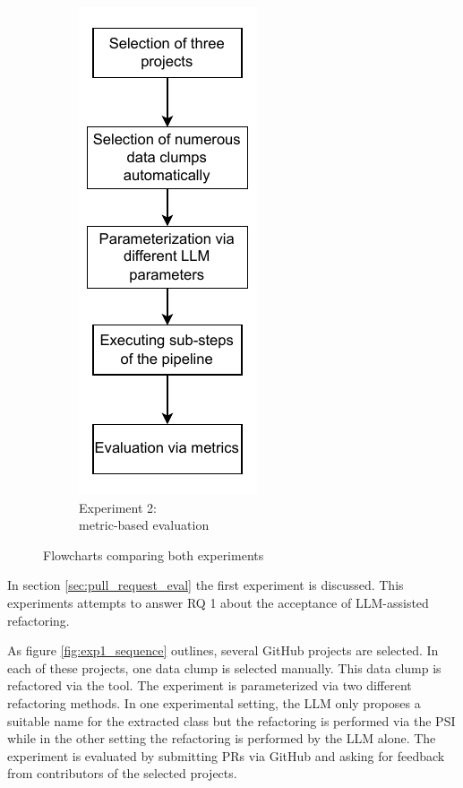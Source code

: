 \begin{figure}[ht!]
\begin{subfigure}[t]{0.49\columnwidth}
        \includegraphics[]{figures/chapter5/evalPartBSequence.drawio.pdf}
        \caption{Experiment 2:\\ metric-based evaluation}
        \label{fig:exp2_sequence}
    \end{subfigure}
    \caption{Flowcharts comparing both experiments}
    \label{fig:exp_comparison}
\end{figure}

In section \ref{sec:pull_request_eval} the  first experiment is discussed.  This experiments attempts to answer RQ 1 about the acceptance of \ac{LLM}-assisted refactoring. 

As figure \ref{fig:exp1_sequence} outlines, several GitHub projects are selected.  In each of these projects, one data clump is selected manually. This data clump is refactored via the tool. The experiment is parameterized via two different refactoring methods. In one experimental setting, the \ac{LLM} only proposes a suitable name for the extracted class but the refactoring is performed via the \ac{PSI}  while in the other setting the refactoring is performed by the \ac{LLM} alone. The experiment is evaluated by submitting \acp{PR} via GitHub and asking for feedback from contributors of the selected projects. 




